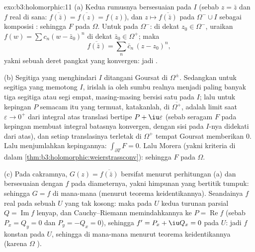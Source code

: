 \begin{solution}{exo:b3:holomorphic:11}
(a) Kedua rumusnya bersesuaian pada $I$ (sebab $z = \bar z$ dan $f$ real
di sana: $\overline{f(\bar z)} = \overline{f(z)} = f(z)$), dan
$z \mapsto \overline{f(\bar z)}$  pada
$\Omega^-\cup I$ sebagai komposisi : sehingga $F$
 pada $\Omega$. Untuk  pada $\Omega^-$: di dekat $z_0
\in \Omega^-$, uraikan $f(w) = \sum c_n(w - \bar z_0)^n$ di dekat
$\bar z_0 \in \Omega^+$; maka
\[
\overline{f(\bar z)} = \sum_n\bar c_n\,(z - z_0)^n,
\]
yakni sebuah deret pangkat yang konvergen: jadi .

(b) Segitiga yang menghindari $I$ ditangani Goursat di
$\Omega^\pm$. Sedangkan untuk segitiga yang memotong $I$, irislah ia oleh sumbu
realnya menjadi paling banyak tiga segitiga atau segi empat, masing-masing bersisi
satu pada $I$; lalu untuk kepingan $P$ semacam itu yang termuat, katakanlah, di
$\overline{\Omega^+}$,  adalah limit saat
$\varepsilon \to 0^+$ dari integral atas translasi bertipe $P + \iu
\varepsilon$ (sebab  seragam $F$ pada
kepingan  membuat integral batasnya konvergen, dengan
sisi pada $I$-nya didekati dari atas), dan setiap translasinya
terletak di $\Omega^+$ tempat Goursat memberikan $0$. Lalu menjumlahkan
kepingannya: $\int_{\partial T}F = 0$. Lalu Morera (yakni kriteria
di dalam \cref{thm:b3:holomorphic:weierstrassconv}): sehingga $F$
 pada $\Omega$.

(c) Pada cakramnya, $G(z) = \overline{f(\bar z)}$ bersifat
 menurut perhitungan (a) dan bersesuaian dengan $f$ pada
diameternya, yakni himpunan yang bertitik tumpuk: sehingga $G = f$ di mana-mana
(menurut teorema keidentikannya). Seandainya $f$ real pada sebuah 
$U$ yang tak kosong: maka pada $U$ kedua turunan parsial $Q = \operatorname{Im}f$
lenyap, dan Cauchy--Riemann memindahkannya ke $P =
\operatorname{Re}f$ (sebab $P_x = Q_y = 0$ dan $P_y = -Q_x = 0$), sehingga
$f' = P_x + \iu Q_x = 0$ pada $U$: jadi $f$ konstan pada $U$,
sehingga di mana-mana menurut teorema keidentikannya (karena $\Omega$
).
\end{solution}

